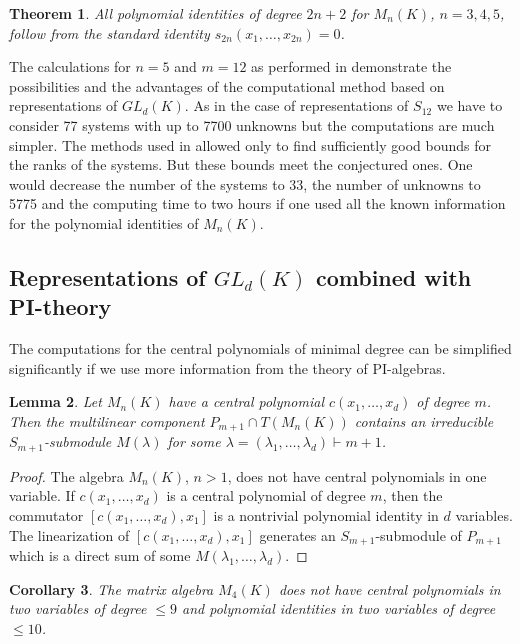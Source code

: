 \documentclass[12pt]{amsart}
\newtheorem{theorem}{Theorem}[section]
\newtheorem{lemma}[theorem]{Lemma}
\newtheorem{corollary}[theorem]{Corollary}
\theoremstyle{definition}
\begin{document}
\begin{theorem}\label{PI of degree n+2}
All polynomial identities of degree $2n+2$ for $M_n(K)$, $n=3,4,5$, follow from the standard identity $s_{2n}(x_1,\ldots,x_{2n})=0$.
\end{theorem}

The calculations for $n=5$ and $m=12$ as performed in
\cite{BenDeDrKo1} demonstrate the possibilities and the advantages of the
computational method based on representations of $GL_d(K)$. As in the case of representations of $S_{12}$
we have to consider 77 systems with up to 7700 unknowns but the computations are much simpler.
The methods used in \cite{BenDeDrKo1} allowed only to find sufficiently good bounds for the ranks of the systems.
But these bounds meet the conjectured ones.
One would decrease the number of the systems to 33, the number of unknowns
to 5775 and the computing time to two hours if one used all the known information for the polynomial identities of $M_n(K)$.

\subsection{Representations of $GL_d(K)$ combined with PI-theory}
The computations for the central polynomials of minimal degree can be simplified significantly if we use more information from the theory of PI-algebras.

\begin{lemma}\label{relation with S_m-characters}
Let $M_n(K)$ have a central polynomial $c(x_1,\ldots,x_d)$ of degree $m$. Then the multilinear component $P_{m+1}\cap T(M_n(K))$
contains an irreducible $S_{m+1}$-submodule $M(\lambda)$ for some $\lambda=(\lambda_1,\ldots,\lambda_d)\vdash m+1$.
\end{lemma}

\begin{proof}
The algebra $M_n(K)$, $n>1$, does not have central polynomials in one variable.
If $c(x_1,\ldots,x_d)$ is a central polynomial of degree $m$, then the commutator $[c(x_1,\ldots,x_d),x_1]$ is a nontrivial polynomial identity in $d$ variables.
The linearization of $[c(x_1,\ldots,x_d),x_1]$ generates an $S_{m+1}$-submodule of $P_{m+1}$ which is a direct sum of some $M(\lambda_1,\ldots,\lambda_d)$.
\end{proof}

\begin{corollary}\label{central polynomials of degree <10}
The matrix algebra $M_4(K)$ does not have central polynomials in two variables of degree $\leq 9$
and polynomial identities in two variables of degree $\leq 10$.
\end{corollary}
\end{document}
